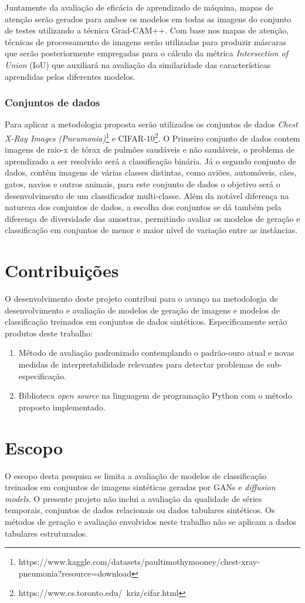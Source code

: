 Juntamente da avaliação de eficácia de aprendizado de máquina, mapas de atenção serão gerados para ambos os modelos em todas as imagens do conjunto de testes utilizando a técnica Grad-CAM++. Com base nos mapas de atenção, técnicas de processamento de imagens serão utilizadas para produzir máscaras que serão posteriormente empregadas para o cálculo da métrica \textit{Intersection of Union} (IoU) que auxiliará na avaliação da similaridade das características aprendidas pelos diferentes modelos.

\subsubsection{Conjuntos de dados}

Para aplicar a metodologia proposta serão utilizados os conjuntos de dados \textit{Chest X-Ray Images (Pneumonia)}\footnote{https://www.kaggle.com/datasets/paultimothymooney/chest-xray-pneumonia?resource=download} e CIFAR-10\footnote{https://www.cs.toronto.edu/~kriz/cifar.html}. O Primeiro conjunto de dados contem imagens de raio-x de tórax de pulmões saudáveis e não saudáveis, o problema de aprendizado a ser resolvido será a classificação binária. Já o segundo conjunto de dados, contêm imagens de várias classes distintas, como aviões, automóveis, cães, gatos, navios e outros animais, para este conjunto de dados o objetivo será o desenvolvimento de um classificador multi-classe.
Além da notável diferença na natureza dos conjuntos de dados, a escolha dos conjuntos se dá também pela diferença de diversidade das amostras, permitindo avaliar os modelos de geração e classificação em conjuntos de menor e maior nível de variação entre as instâncias.

\section{Contribuições}
O desenvolvimento deste projeto contribui para o avanço na metodologia de desenvolvimento e avaliação de modelos de geração de imagens e modelos de classificação treinados em conjuntos de dados sintéticos. Especificamente serão produtos deste trabalho:

\begin{enumerate}
    \item Método de avaliação padronizado contemplando o padrão-ouro atual e novas medidas de interpretabilidade relevantes para detectar problemas de sub-especificação.
    \item Biblioteca \textit{open source} na linguagem de programação Python com o método proposto implementado.
\end{enumerate}


\section{Escopo}

O escopo desta pesquisa se limita a avaliação de modelos de classificação treinados em conjuntos de imagens sintéticas geradas por GANs e \textit{diffusion models}. O presente projeto não inclui a avaliação da qualidade de séries temporais, conjuntos de dados relacionais ou dados tabulares sintéticos. Os métodos de geração e avaliação envolvidos neste trabalho não se aplicam a dados tabulares estruturados.
